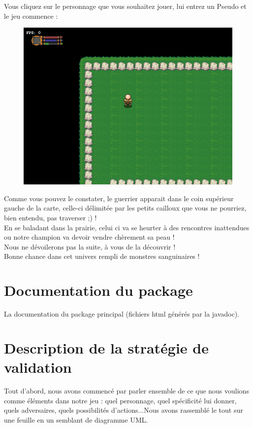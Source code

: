 \documentclass[a4paper,titlepage]{article}
\begin{document}
	Vous cliquez sur le personnage que vous souhaitez jouer, lui entrez un Pseudo et le jeu commence :
	\begin{figure}[h!]
		\includegraphics[scale=0.65]{carteJeu.png}
	\end{figure}
	
	Comme vous pouvez le constater, le guerrier apparait dans le coin supérieur gauche de la carte, celle-ci délimitée par les petits cailloux que vous ne pourriez, bien entendu, pas traverser ;) !\\
	
	En se baladant dans la prairie, celui ci va se heurter à des rencontres inattendues ou notre champion va devoir vendre chèrement sa peau !\\
	
	Nous ne dévoilerons pas la suite, à vous de la découvrir !\\
	
	Bonne chance dans cet univers rempli de monstres sanguinaires !
	\clearpage
	
	\section{Documentation du package}
	La documentation du package principal (fichiers html générés par la javadoc).
	\clearpage
	
	\section{Description de la stratégie de validation}
	Tout d’abord, nous avons commencé par parler ensemble de ce que nous voulions comme éléments dans notre jeu : quel personnage, quel spécificité lui donner, quels adversaires, quels possibilités d’actions...Nous avons rassemblé le tout sur une feuille en un semblant de diagramme UML.\\
\end{document}
